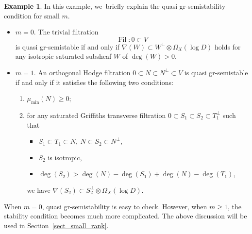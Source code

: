 \documentclass[JEP,XML,SOM,Unicode,published]{cedram}
\newcommand{\grsemistable}{gr\nobreakdash-semi\-stable\xspace}
\DeclareMathOperator{\Filt}{Fil}
\theoremstyle{plain}
\theoremstyle{definition}
\newtheorem{examp}[thm]{Example}
\begin{document}
\begin{examp}\label{smallm}
In this example, we~briefly explain the quasi gr-semistability condition for small $m$.

\begin{itemize}
\item $m=0$.
The trivial filtration
\[
\Filt:0\subset V
\]
is quasi \grsemistable if and only if $\nabla(W)\subset W^\perp\otimes\Omega_X(\log D)$ holds for any isotropic saturated subsheaf $W$ of $\deg(W)>0$.

\item $m=1$.
An orthogonal Hodge filtration $0\subset N\subset N^\perp\subset V$ is quasi \grsemistable if and only if it satisfies the following two conditions:
\begin{enumerate}
\item $\mu_{\min}(N)\geq 0$;
\item for any saturated Griffiths transverse filtration $0\!\subset\! S_1\!\subset\! S_2\!\subset\! T_1^\perp$ such that
\begin{itemize}
\item[$\scriptscriptstyle\bullet$] $S_1\subset T_1\subset N,\ N\subset S_2\subset N^\perp $,
\item[$\scriptscriptstyle\bullet$] $S_2$ is isotropic,
\item[$\scriptscriptstyle\bullet$] $\deg(S_2)>\deg(N)-\deg(S_1)+\deg(N)-\deg(T_1)$,
\end{itemize}
we have $\nabla(S_2)\subset S_2^\perp\otimes \Omega_X(\log D)$.
\end{enumerate}
\end{itemize}
When $m=0$, quasi gr-semistability is easy to check. However, when $m \geq 1$, the stability condition becomes much more complicated. The above discussion will be used in Section~\ref{sect_small_rank}.
\end{examp}
\end{document}

